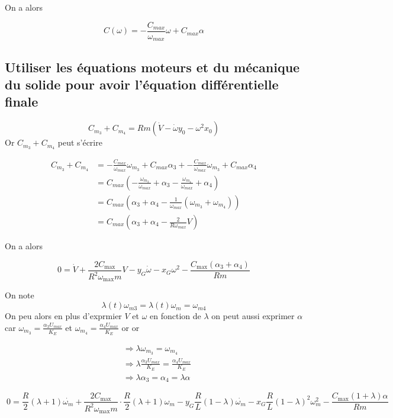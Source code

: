 \documentclass[a4paper,12pt]{report}  %
\begin{document}
On a alors

$$
C(\omega) = -\frac{C_{max}}{\omega_{max}}\omega + C_{max}\alpha 
$$

\subsection{Utiliser les équations moteurs et du mécanique du solide pour avoir l'équation différentielle finale} 


$$
C_{m_3} + C_{m_4} = Rm(\dot{V} - \dot{\omega} y_0 - \omega^2 x_0)
$$
Or $C_{m_3} + C_{m_4}$ peut s'écrire

\begin{align}
	C_{m_3} + C_{m_4} &= -\frac{C_{max}}{\omega_{max}}\omega_{m_3} + C_{max}\alpha_3 + -\frac{C_{max}}{\omega_{max}}\omega_{m_3} + C_{max}\alpha_4	\\
	&= C_{max}(-\frac{\omega_{m_3}}{\omega_{max}} + \alpha_3  -\frac{\omega_{m_4}}{\omega_{max}} + \alpha_4)	\\
	&= C_{max}(\alpha_3 + \alpha_4 -\frac{1}{\omega_{max}}(\omega_{m_3} + \omega_{m_4}))	\\
	&= C_{max}(\alpha_3 + \alpha_4 -\frac{2}{R\omega_{max}}V)
\end{align}

On a alors

$$
\ 0 = \dot{V} + \frac{2 C_{\text{max}}}{R^2 \omega_{\text{max}} m} V - y_G \dot{\omega} - x_G \omega^2 - \frac{C_{\text{max}} (\alpha_3 + \alpha_4)}{R m} \
$$

On note
$$
\lambda (t){\omega}_{m3} = \lambda(t) {\omega_{m}} = \omega_{m4} 
$$
On peu alors en plus d'exprmier $V$ et $\omega$ en fonction de $\lambda$ on peut aussi exprimer $\alpha$ 
car $\omega_{m_3} = \frac{\alpha_3 U_{max}}{K_E}$  et  $\omega_{m_4} = \frac{\alpha_4 U_{max}}{K_E}$ or 
or 

\begin{align}
	&\Rightarrow \lambda \omega_{m_3} = \omega_{m_4}
	\\
	&\Rightarrow \lambda\frac{\alpha_3 U_{max}}{K_E}=\frac{\alpha_4 U_{max}}{K_E}
	\\
	&\Rightarrow\lambda\alpha_3=\alpha_4 = \lambda\alpha
\end{align}


$$
\ 0 = \frac{R}{2} (\lambda + 1)\dot{\omega_m} + \frac{2 C_{\text{max}}}{R^2 \omega_{\text{max}} m} \cdot \frac{R}{2} (\lambda + 1)\omega_m - y_G \frac{R}{L} (1 - \lambda)\dot{\omega_m} - x_G \frac{R}{L} (1 - \lambda)^2 \omega_m^2 - \frac{ C_{\text{max}} (1 + \lambda) \alpha}{R m} \
$$
\end{document}
